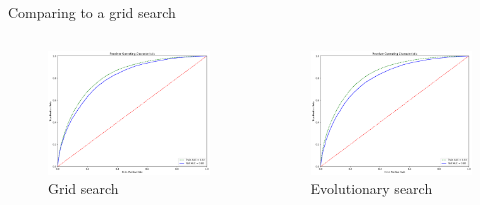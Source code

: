\begin{frame}{Comparing to a grid search}
    \begin{columns}
        \begin{column}{0.5\textwidth}
            \begin{figure}
                \centering
                \includegraphics[width = \textwidth]{grid_ROC.png}
                \caption{Grid search}
            \end{figure}
        \end{column}
        \begin{column}{0.5\textwidth}
            \begin{figure}
                \centering
                \includegraphics[width = \textwidth]{evo_ROC.png}
                \caption{Evolutionary search}
            \end{figure}
        \end{column}
    \end{columns}
\end{frame}


